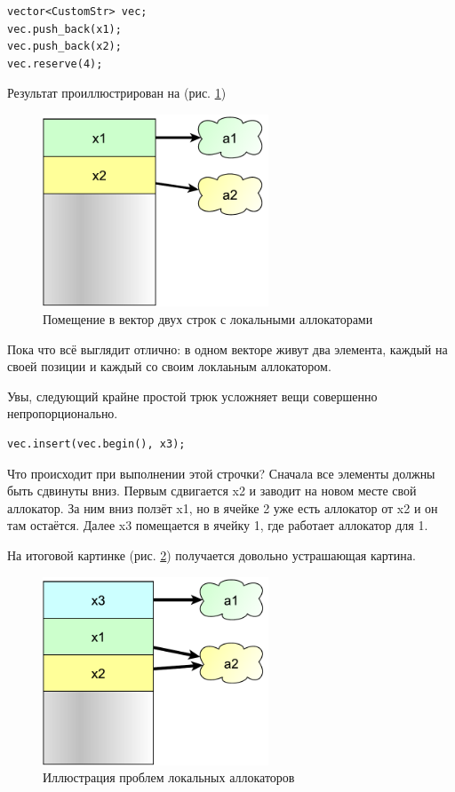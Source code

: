 \documentclass[a4paper,12pt,oneside]{book}
\begin{document}
\begin{lstlisting}
vector<CustomStr> vec;
vec.push_back(x1);
vec.push_back(x2);
vec.reserve(4);
\end{lstlisting}

Результат проиллюстрирован на (рис. \ref{fig:allocs_local})

\begin{figure}[ht]
\centering
\includegraphics[width=0.6\textwidth]{illustrations/allocs-local-crop.pdf}
\caption{Помещение в вектор двух строк с локальными аллокаторами}
\label{fig:allocs_local}
\end{figure}

Пока что всё выглядит отлично: в одном векторе живут два элемента, каждый на своей позиции и каждый со своим локлаьным аллокатором.

Увы, следующий крайне простой трюк усложняет вещи совершенно непропорционально.

\begin{lstlisting}
vec.insert(vec.begin(), x3);
\end{lstlisting}

Что происходит при выполнении этой строчки? Сначала все элементы должны быть сдвинуты вниз. Первым сдвигается x2 и заводит на новом месте свой аллокатор. За ним вниз ползёт x1, но в ячейке 2 уже есть аллокатор от x2 и он там остаётся. Далее x3 помещается в ячейку 1, где работает аллокатор для 1.

На итоговой картинке (рис. \ref{fig:allocs_scope}) получается довольно устрашающая картина.

\begin{figure}[ht]
\centering
\includegraphics[width=0.6\textwidth]{illustrations/allocs-scope-crop.pdf}
\caption{Иллюстрация проблем локальных аллокаторов}
\label{fig:allocs_scope}
\end{figure}
\end{document}
